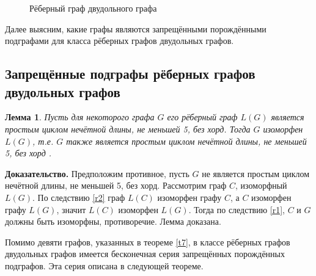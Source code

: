 \documentclass[12pt]{article}
\newtheorem{lemma}{\hspace{1cm}Лемма}
\begin{document}
\begin{figure}
	\label{pic14}
	\caption{Рёберный граф двудольного графа}
\end{figure}

Далее выясним, какие графы являются запрещёнными порождёнными подграфами для класса рёберных графов двудольных графов.

\begin{center}
	\subsection{Запрещённые подграфы рёберных
				 графов двудольных графов}
\end{center}

\begin{lemma}
	\label{l1}
Пусть для некоторого графа $G$ его рёберный граф $L(G)$ является простым циклом нечётной длины, не меньшей 5, без хорд. Тогда $G$ изоморфен $L(G)$, т.е. $G$ также является простым циклом нечётной длины, не меньшей 5, без хорд .
\end{lemma}
	{\bf Доказательство.} 
	Предположим противное, пусть $G$ не является простым циклом нечётной длины, не меньшей 5, без хорд. Рассмотрим граф $C$, изоморфный $L(G)$. По следствию \ref{r2} граф $L(C)$ изоморфен графу $C$, а $C$ изоморфен графу $L(G)$, значит $L(C)$ изоморфен $L(G)$. Тогда по следствию \ref{r1}, $C$ и $G$ должны быть изоморфны, противоречие. Лемма доказана.

	Помимо девяти графов, указанных в теореме \ref{t7}, в классе рёберных графов двудольных графов имеется бесконечная серия запрещённых порождённых подграфов. Эта серия описана в следующей теореме.
	
\end{document}
